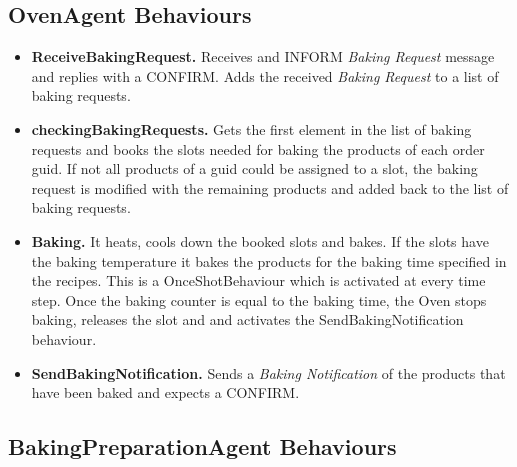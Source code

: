 \documentclass[paper=a4, fontsize=11pt]{scrartcl}
\begin{document}
	\subsection*{OvenAgent Behaviours}
	
	\begin{itemize}
		\item \textbf{ReceiveBakingRequest.} Receives and INFORM \textit{Baking Request} message and replies with a CONFIRM. Adds the received \textit{Baking Request} to a list of baking requests.
		
		\item \textbf{checkingBakingRequests.} Gets the first element in the list of baking requests and books the slots needed for baking the products of each order guid. If not all products of a guid could be assigned to a slot, the baking request is modified with the remaining products and added back to the list of baking requests.
		
		\item \textbf{Baking.} It heats, cools down the booked slots and bakes. If the slots have the baking temperature it bakes the products for the baking time specified in the recipes. This is a OnceShotBehaviour which is activated at every time step. Once the baking counter is equal to the baking time, the Oven stops baking, releases the slot and  and activates the SendBakingNotification behaviour.  
		
		\item \textbf{SendBakingNotification.} Sends a \textit{Baking Notification} of the products that have been baked and expects a CONFIRM.	
		
	\end{itemize}
	
		\subsection*{BakingPreparationAgent Behaviours}
		
\end{document}
